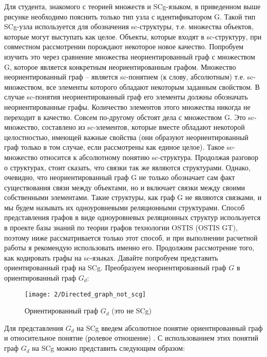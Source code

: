 Для студента, знакомого с теорией множеств и SCg-языком, в приведенном
выше рисунке необходимо пояснить только тип узла с идентификатором
G. Такой тип SCg-узла используется для обозначения sc-структуры,
т.е. множества объектов, которые могут выступать как целое. Объекты,
которые входят в sc-структуру, при совместном рассмотрении порождают
некоторое новое качество. Попробуем изучить это через сравнение
множества неориентированный граф с множеством G, которое является
конкретным неориентированным графом.  Множество неориентированный граф
– является sc-понятием (к слову, абсолютным) т.е. sc-множеством, все
элементы которого обладают некоторым заданным свойством. В случае
sc-понятия неориентированный граф его элементы должны обозначать
неориентированные графы. Количество элементов этого множества никогда
не переходит в качество. Совсем по-другому обстоят дела с множеством
G. Это sc-множество, составлено из sc-элементов, которые вместе
обладают некоторой целостностью, имеющей важные свойства (они образуют
неориентированный граф только в том случае, если рассмотрены как
единое целое). Такое sc-множество относится к абсолютному понятию
sc-структура.  Продолжая разговор о структурах, стоит сказать, что
связки так же являются структурами. Однако, очевидно, что
неориентированный граф G не только обозначает сам факт существования
связи между объектами, но и включает связки между своими собственными
элементами. Такие структуры, как граф G не являются связками, и мы
будем называть их одноуровневыми реляционными структурами.  Способ
представления графов в виде одноуровневых реляционных структур
используется в проекте базы знаний по теории графов технологии OSTIS
(OSTIS GT), поэтому ниже рассматривается только этот способ, и при
выполнении расчетной работы я рекомендую использовать именно
его. Продолжим рассмотрение того, как кодировать графы на sc-языках.
Давайте попробуем представить ориентированный граф на SCg. Преобразуем
неориентированный граф $G$ в ориентированный граф $G_d$:

\begin{figure}[h]
  \centering
  \texttt{[image: 2/Directed\_graph\_not\_scg]}
  \caption{Ориентированный граф $G_d$ (это не SCg)}
  \label{fig:Directed_graph_not_scg}
\end{figure}

Для представления $G_d$ на SCg введем абсолютное понятие
ориентированный граф и относительное понятие (ролевое отношение)
. С использованием этих понятий граф $G_d$ на SCg можно
представить следующим образом:

